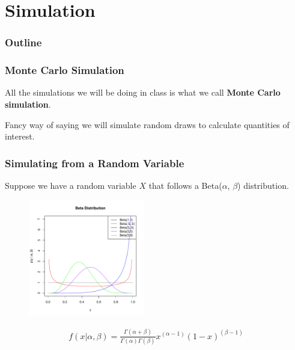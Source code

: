 \documentclass[handout]{beamer}
\begin{document}
\section{Simulation}

\begin{frame}
\frametitle{Outline}
\tableofcontents[currentsection]
\end{frame}

\begin{frame}
\frametitle{Monte Carlo Simulation}
\pause
All the simulations we will be doing in class is what we call
\textbf{Monte Carlo simulation}.
\pause
\begin{figure}[!htp]
\end{figure}
\pause
Fancy way of saying we will simulate random draws to calculate
quantities of interest.
\end{frame}

\begin{frame}
\frametitle{Simulating from a Random Variable}
\pause
Suppose we have a random variable $X$ that follows a Beta($\alpha$,
$\beta$) distribution.
\pause
\begin{figure}[!htp]
\begin{center}
\includegraphics[width=2in, height=2in]{probability-beta.pdf}
\end{center}
\end{figure}
\pause
\begin{eqnarray*}
f(x| \alpha, \beta) = \frac{\Gamma (\alpha + \beta)}{\Gamma (\alpha)
\Gamma (\beta)} x^{(\alpha - 1)} (1 - x)^{(\beta-1)}\\
\end{eqnarray*}
\end{frame}
\end{document}
